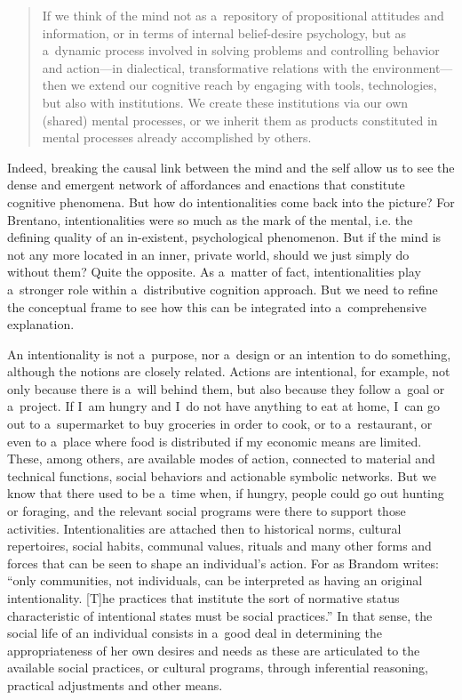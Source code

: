 \begin{quotation}
If we think of the mind not as a~repository of propositional attitudes and information, or in terms of internal belief-desire psychology, but as a~dynamic process involved in solving problems and controlling behavior and action—in dialectical, transformative relations with the environment—then we extend our cognitive reach by engaging with tools, technologies, but also with institutions. We create these institutions via our own (shared) mental processes, or we inherit them as products constituted in mental processes already accomplished by others.

\end{quotation}
Indeed, breaking the causal link between the mind and the self allow us to see the dense and emergent network of affordances and enactions that constitute cognitive phenomena. But how do intentionalities come back into the picture? For Brentano, intentionalities were so much as the mark of the mental, i.e. the defining quality of an in-existent, psychological phenomenon. But if the mind is not any more located in an inner, private world, should we just simply do without them? Quite the opposite. As a~matter of fact, intentionalities play a~stronger role within a~distributive cognition approach. But we need to refine the conceptual frame to see how this can be integrated into a~comprehensive explanation.

An intentionality is not a~purpose, nor a~design or an intention to do something, although the notions are closely related. Actions are intentional, for example, not only because there is a~will behind them, but also because they follow a~goal or a~project. If I~am hungry and I~do not have anything to eat at home, I~can go out to a~supermarket to buy groceries in order to cook, or to a~restaurant, or even to a~place where food is distributed if my economic means are limited. These, among others, are available modes of action, connected to material and technical functions, social behaviors and actionable symbolic networks. But we know that there used to be a~time when, if hungry, people could go out hunting or foraging, and the relevant social programs were there to support those activities. Intentionalities are attached then to historical norms, cultural repertoires, social habits, communal values, rituals and many other forms and forces that can be seen to shape an individual's action. For as Brandom
\parencite*[][p.61]{brandom_making_1994} %
 writes: ``only communities, not individuals, can be interpreted as having an original intentionality. [T]he practices that institute the sort of normative status characteristic of intentional states must be social practices.'' In that sense, the social life of an individual consists in a~good deal in determining the appropriateness of her own desires and needs as these are articulated to the available social practices, or cultural programs, through inferential reasoning, practical adjustments and other means.

